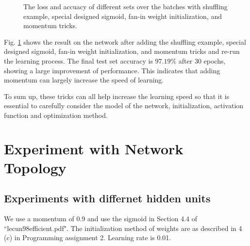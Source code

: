 \documentclass{article} %
\begin{document}
\begin{figure} [!htbp]
	
	\caption{The loss and accuacy of different sets over the batches with shuffling example, special designed sigmoid, fan-in weight initialization, and momentum tricks. }  
	\label{fig:P5}
\end{figure}

Fig. \ref{fig:P5} shows the result on the network after adding the shuffling example, special designed sigmoid, fan-in weight initialization, and momentum tricks and re-run the learning process. The final test set accuracy is $97.19\%$ after 30 epochs, showing a large improvement of performance. This indicates that adding momentum can largely increase the speed of learning.

To sum up, these tricks can all help increase the learning speed so that it is essential to carefully consider the model of the network, initialization, activation function and optimization method.

\section{Experiment with Network Topology}

\subsection{Experiments with differnet hidden units}
We use a momentum of 0.9 and use the sigmoid in Section 4.4 of ``lecun98efficient.pdf". The initialization method of weights are as described in 4 (c) in Programming assignment 2. Learning rate is 0.01.
\end{document}
